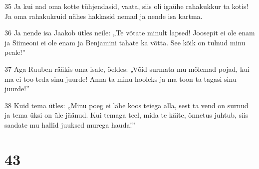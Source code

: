 \par 35 Ja kui nad oma kotte tühjendasid, vaata, siis oli igaühe rahakukkur ta kotis! Ja oma rahakukruid nähes hakkasid nemad ja nende isa kartma.
\par 36 Ja nende isa Jaakob ütles neile: „Te võtate minult lapsed! Joosepit ei ole enam ja Siimeoni ei ole enam ja Benjamini tahate ka võtta. See kõik on tulnud minu peale!”
\par 37 Aga Ruuben rääkis oma isale, öeldes: „Võid surmata mu mõlemad pojad, kui ma ei too teda sinu juurde! Anna ta minu hooleks ja ma toon ta tagasi sinu juurde!”
\par 38 Kuid tema ütles: „Minu poeg ei lähe koos teiega alla, sest ta vend on surnud ja tema üksi on üle jäänud. Kui temaga teel, mida te käite, õnnetus juhtub, siis saadate mu hallid juuksed murega hauda!”

\chapter{43}

